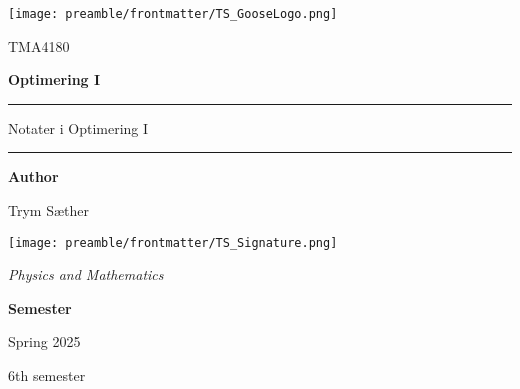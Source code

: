 \begin{titlepage}
    \newcommand{\HRule}{\rule{\linewidth}{0.5mm}}
    \center
    
    \vspace*{1.5cm}  %
    \begin{center}
        \texttt{[image: preamble/frontmatter/TS\_GooseLogo.png]}
    \end{center}
    
    \vspace{1.5cm}  %
    
    {\color{ntnu-blue}\sffamily\LARGE TMA4180 \par}
    \vspace{0.5cm}  %
    {\sffamily\huge\bfseries\color{black} Optimering I \par}
    
    \vspace{1.2cm}  %
    
    {\color{ntnu-lightblue}\HRule}
    \vspace{0.5cm}  %
    {\Large\sffamily\color{ntnu-blue} Notater i Optimering I \par}
    \vspace{0.5cm}  %
    {\color{ntnu-lightblue}\HRule}
    
    \vspace{1.5cm}  %
    
    \begin{minipage}{0.48\textwidth}
        \begin{flushleft}
            \large
            {\color{ntnu-blue}\textbf{Author}}\par
            \vspace{0.15cm}  %
            Trym Sæther\par
            \vspace{0.2cm}  %
            \texttt{[image: preamble/frontmatter/TS\_Signature.png]}\par
            \vspace{0.2cm}  %
            {\color{ntnu-purple}\textit{Physics and Mathematics}}
        \end{flushleft}
    \end{minipage}
    \hfill
    \begin{minipage}{0.48\textwidth}
        \begin{flushright}
            \large
            {\color{ntnu-blue}\textbf{Semester}}\par
            \vspace{0.15cm}  %
            Spring 2025\par
            6th semester
        \end{flushright}
    \end{minipage}
    

\end{titlepage}
